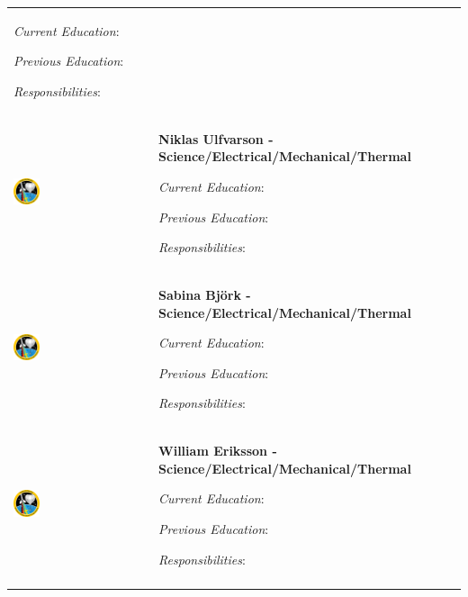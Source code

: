 \begin{longtable}[]{m{} m{}}
\smallskip
\textit{Current Education}: 

\smallskip
\textit{Previous Education}:

\smallskip
\textit{Responsibilities}:                           
\bigskip
\\
 \includegraphics[width=0.2\textwidth]{0-cover/img/logo-rexus-bexus.png}  & \textbf{Niklas Ulfvarson - Science/Electrical/Mechanical/Thermal}

\smallskip
\textit{Current Education}: 

\smallskip
\textit{Previous Education}:

\smallskip
\textit{Responsibilities}:                           
\bigskip
\\
 \includegraphics[width=0.2\textwidth]{0-cover/img/logo-rexus-bexus.png}  & \textbf{Sabina Bj\"ork - Science/Electrical/Mechanical/Thermal}

\smallskip
\textit{Current Education}: 

\smallskip
\textit{Previous Education}:

\smallskip
\textit{Responsibilities}:                           
\bigskip
\\
 \includegraphics[width=0.2\textwidth]{0-cover/img/logo-rexus-bexus.png}  & \textbf{William Eriksson - Science/Electrical/Mechanical/Thermal}

\smallskip
\textit{Current Education}: 

\smallskip
\textit{Previous Education}:

\smallskip
\textit{Responsibilities}:                           
\bigskip
\\
\label{tab:people}
\end{longtable}
\raggedbottom